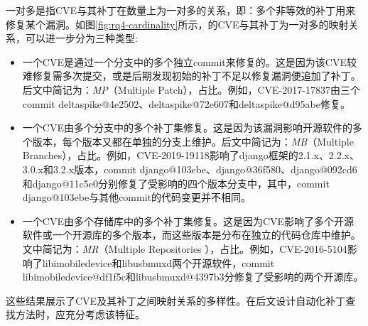 一对多是指CVE与其补丁在数量上为一对多的关系，即：多个非等效的补丁用来修复某个漏洞。如图\ref{fig:rq4-cardinality}所示，的CVE与其补丁为一对多的映射关系，可以进一步分为三种类型: 

\begin{itemize}[leftmargin=*]
\item 一个CVE是通过一个分支中的多个独立commit来修复的。这是因为该CVE较难修复需多次提交，或是后期发现初始的补丁不足以修复漏洞便追加了补丁。后文中简记为：\textit{MP}（Multiple Patch），占比。例如，CVE-2017-17837由三个commit deltaspike@4e2502\cite{deltaspike-1}、deltaspike@72e607\cite{deltaspike-2}和deltaspike@d95abe\cite{deltaspike-3}修复。
\item 一个CVE由多个分支中的多个补丁集修复。这是因为该漏洞影响开源软件的多个版本，每个版本又都在单独的分支上维护。后文中简记为：\textit{MB}（Multiple Branches），占比。例如，CVE-2019-19118影响了django框架的2.1.x、2.2.x、3.0.x和3.2.x版本，commit django@103ebe\cite{django-1}、django@36f580\cite{django-2}、django@092cd6\cite{django-3}和django@11c5e0\cite{django-4}分别修复了受影响的四个版本分支中，其中，commit django@103ebe与其他commit的代码变更并不相同。
\item 一个CVE由多个存储库中的多个补丁集修复。这是因为CVE影响了多个开源软件或一个开源库的多个版本，而这些版本是分布在独立的代码仓库中维护。文中简记为：\textit{MR}（Multiple Repositories ），占比。例如，CVE-2016-5104影响了libimobiledevice和libusbmuxd两个开源软件，commit libimobiledevice@df1f5c\cite{libimobiledevice}和libusbmuxd@4397b3\cite{libusbmuxd}分修复了受影响的两个开源库。

\end{itemize}

这些结果展示了CVE及其补丁之间映射关系的多样性。在后文设计自动化补丁查找方法时，应充分考虑该特征。

